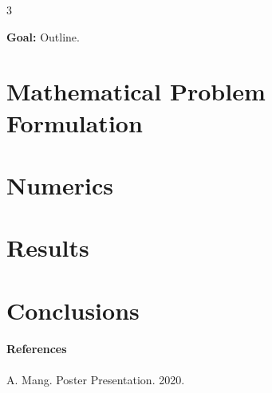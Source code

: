 \documentclass[plainsections,30pt]{sciposter}
\def\numcols{3}
\begin{document}
\begin{multicols}{\numcols}

\begin{sectionbox}{}
\textbf{Goal:} Outline.
\end{sectionbox}




\section*{Mathematical Problem Formulation}




\section*{Numerics}




\section*{Results}




\section*{Conclusions}




\paragraph{References}
\begin{footnotesize}
\begin{bibenum}[itemsep=5pt]
\item A. Mang. Poster Presentation. 2020.
\end{bibenum}
\end{footnotesize}


\end{multicols}
\end{document}
